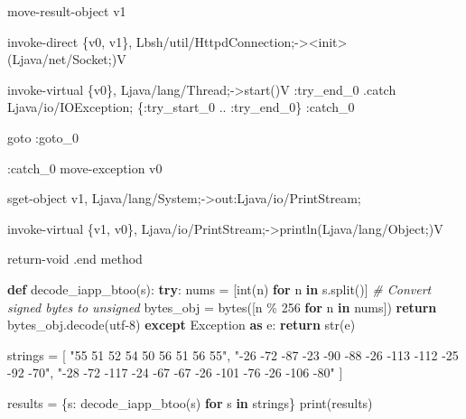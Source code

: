 \documentclass[
]{article}
\newenvironment{Shaded}{}{}
\newcommand{\BuiltInTok}[1]{\textcolor[rgb]{0.00,0.50,0.00}{#1}}
\newcommand{\CommentTok}[1]{\textcolor[rgb]{0.38,0.63,0.69}{\textit{#1}}}
\newcommand{\ControlFlowTok}[1]{\textcolor[rgb]{0.00,0.44,0.13}{\textbf{#1}}}
\newcommand{\DecValTok}[1]{\textcolor[rgb]{0.25,0.63,0.44}{#1}}
\newcommand{\ImportTok}[1]{\textcolor[rgb]{0.00,0.50,0.00}{\textbf{#1}}}
\newcommand{\KeywordTok}[1]{\textcolor[rgb]{0.00,0.44,0.13}{\textbf{#1}}}
\newcommand{\NormalTok}[1]{#1}
\newcommand{\OperatorTok}[1]{\textcolor[rgb]{0.40,0.40,0.40}{#1}}
\newcommand{\PreprocessorTok}[1]{\textcolor[rgb]{0.74,0.48,0.00}{#1}}
\newcommand{\StringTok}[1]{\textcolor[rgb]{0.25,0.44,0.63}{#1}}
\begin{document}
\begin{Shaded}
\begin{Highlighting}[]
\NormalTok{    move{-}result{-}object v1}

\NormalTok{    invoke{-}direct \{v0, v1\}, Lbsh/util/HttpdConnection;{-}\textgreater{}\textless{}init\textgreater{}(Ljava/net/Socket;)V}

\NormalTok{    invoke{-}virtual \{v0\}, Ljava/lang/Thread;{-}\textgreater{}start()V}
\NormalTok{    :try\_end\_0}
\NormalTok{    .catch Ljava/io/IOException; \{:try\_start\_0 .. :try\_end\_0\} :catch\_0}

\NormalTok{    goto :goto\_0}

\NormalTok{    :catch\_0}
\NormalTok{    move{-}exception v0}

\NormalTok{    sget{-}object v1, Ljava/lang/System;{-}\textgreater{}out:Ljava/io/PrintStream;}

\NormalTok{    invoke{-}virtual \{v1, v0\}, Ljava/io/PrintStream;{-}\textgreater{}println(Ljava/lang/Object;)V}

\NormalTok{    return{-}void}
\NormalTok{.end method}
\end{Highlighting}
\end{Shaded}

\begin{Shaded}
\begin{Highlighting}[]
\KeywordTok{def}\NormalTok{ decode\_iapp\_btoo(s):}
    \ControlFlowTok{try}\NormalTok{:}
\NormalTok{        nums }\OperatorTok{=}\NormalTok{ [}\BuiltInTok{int}\NormalTok{(n) }\ControlFlowTok{for}\NormalTok{ n }\KeywordTok{in}\NormalTok{ s.split()]}
        \CommentTok{\# Convert signed bytes to unsigned}
\NormalTok{        bytes\_obj }\OperatorTok{=} \BuiltInTok{bytes}\NormalTok{([n }\OperatorTok{\%} \DecValTok{256} \ControlFlowTok{for}\NormalTok{ n }\KeywordTok{in}\NormalTok{ nums])}
        \ControlFlowTok{return}\NormalTok{ bytes\_obj.decode(}\StringTok{\textquotesingle{}utf{-}8\textquotesingle{}}\NormalTok{)}
    \ControlFlowTok{except} \PreprocessorTok{Exception} \ImportTok{as}\NormalTok{ e:}
        \ControlFlowTok{return} \BuiltInTok{str}\NormalTok{(e)}

\NormalTok{strings }\OperatorTok{=}\NormalTok{ [}
    \StringTok{"55 51 52 54 50 56 51 56 55"}\NormalTok{,}
    \StringTok{"{-}26 {-}72 {-}87 {-}23 {-}90 {-}88 {-}26 {-}113 {-}112 {-}25 {-}92 {-}70"}\NormalTok{,}
    \StringTok{"{-}28 {-}72 {-}117 {-}24 {-}67 {-}67 {-}26 {-}101 {-}76 {-}26 {-}106 {-}80"}
\NormalTok{]}

\NormalTok{results }\OperatorTok{=}\NormalTok{ \{s: decode\_iapp\_btoo(s) }\ControlFlowTok{for}\NormalTok{ s }\KeywordTok{in}\NormalTok{ strings\}}
\BuiltInTok{print}\NormalTok{(results)}
\end{Highlighting}
\end{Shaded}
\end{document}
